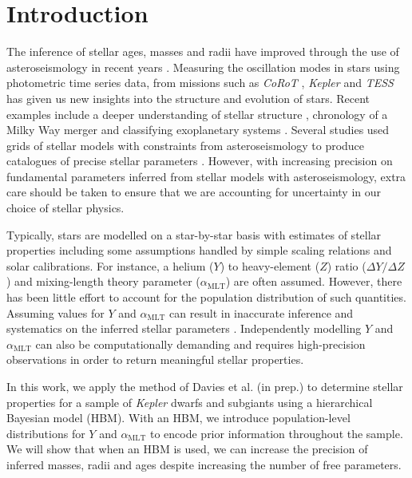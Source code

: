 \documentclass[a4paper,fleqn,usenatbib]{mnras}
\newcommand{\mlt}{\ensuremath{{\alpha_\mathrm{MLT}}}}
\begin{document}


\section{Introduction}

The inference of stellar ages, masses and radii have improved through the use of asteroseismology in recent years \citep[e.g. see the review by][]{Chaplin.Miglio2013}. Measuring the oscillation modes in stars using photometric time series data, from missions such as \emph{CoRoT} \citep{Baglin.Auvergne.ea2006}, \emph{Kepler} \citep{Borucki.Koch.ea2010} and \emph{TESS} \citep{Ricker.Winn.ea2015} has given us new insights into the structure and evolution of stars. Recent examples include a deeper understanding of stellar structure \citep{Verma.Raodeo.ea2017}, chronology of a Milky Way merger \citep{Chaplin.Serenelli.ea2020} and classifying exoplanetary systems \citep{Huber.Chaplin.ea2019}. Several studies used grids of stellar models with constraints from asteroseismology to produce catalogues of precise stellar parameters \citep{Pinsonneault.Elsworth.ea2014, SilvaAguirre.Lund.ea2017}. However, with increasing precision on fundamental parameters inferred from stellar models with asteroseismology, extra care should be taken to ensure that we are accounting for uncertainty in our choice of stellar physics.

Typically, stars are modelled on a star-by-star basis with estimates of stellar properties including some assumptions handled by simple scaling relations and solar calibrations. %
For instance, a helium ($Y$) to heavy-element ($Z$) ratio ($\Delta Y / \Delta Z$) and mixing-length theory parameter ($\mlt$) are often assumed. However, there has been little effort to account for the population distribution of such quantities. Assuming values for $Y$ and $\mlt$ can result in inaccurate inference and systematics on the inferred stellar parameters \citep{Valle.DellOmodarme.ea2015}. Independently modelling $Y$ and $\mlt$ can also be computationally demanding and requires high-precision observations in order to return meaningful stellar properties.

In this work, we apply the method of Davies et al. (in prep.) to determine stellar properties for a sample of \emph{Kepler} dwarfs and subgiants using a hierarchical Bayesian model (HBM). With an HBM, we introduce population-level distributions for $Y$ and $\mlt$ to encode prior information throughout the sample. We will show that when an HBM is used, we can increase the precision of inferred masses, radii and ages despite increasing the number of free parameters.
\end{document}
